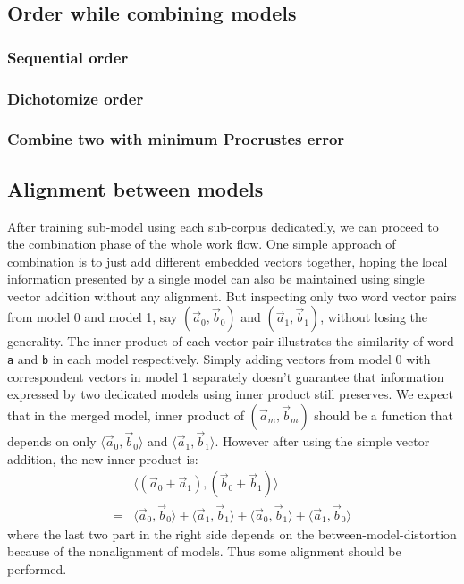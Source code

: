 \documentclass[11pt,a4paper]{article}
\begin{document}
  \subsection{Order while combining models}
  \subsubsection{Sequential order}
  \subsubsection{Dichotomize order}
  \subsubsection{Combine two with minimum Procrustes error}

  \subsection{Alignment between models}
  After training sub-model using each sub-corpus dedicatedly, we can proceed to the combination phase of the whole work flow. One simple approach of combination is to just add different embedded vectors together, hoping the local information presented by a single model can also be maintained using single vector addition without any alignment. But inspecting only two word vector pairs from model 0 and model 1, say $(\vec{a}_0, \vec{b}_0)$ and $(\vec{a}_1, \vec{b}_1)$, without losing the generality. The inner product of each vector pair illustrates the similarity of word \verb|a| and \verb|b| in each model respectively. Simply adding vectors from model 0 with correspondent vectors in model 1 separately doesn't guarantee that information expressed by two dedicated models using inner product still preserves. We expect that in the merged model, inner product of $(\vec{a}_m,\vec{b}_m)$ should be a function that depends on only $\langle\vec{a}_0,\vec{b}_0\rangle$ and $\langle\vec{a}_1, \vec{b}_1\rangle$. However after using the simple vector addition, the new inner product is:
  \begin{equation}\label{eq:inner_product}
  \begin{split}
  &\langle(\vec{a}_0+\vec{a}_1), (\vec{b}_0+\vec{b}_1)\rangle\\
  = &\langle\vec{a}_0,\vec{b}_0\rangle+
    \langle\vec{a}_1,\vec{b}_1\rangle+
    \langle\vec{a}_0,\vec{b}_1\rangle+
    \langle\vec{a}_1,\vec{b}_0\rangle
  \end{split}
  \end{equation}
  where the last two part in the right side depends on the between-model-distortion because of the nonalignment of models. Thus some alignment should be performed.
\end{document}
